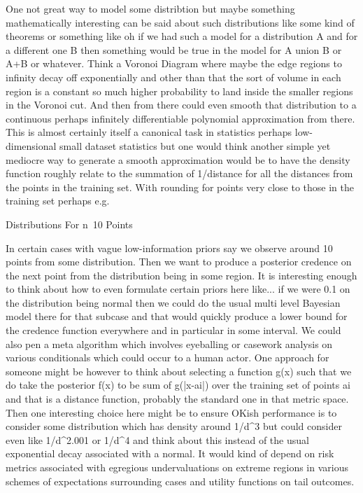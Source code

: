 One not great way to model some distribtion but maybe something mathematically interesting can be said about such distributions like some kind of theorems or something like oh if we had such a model for a distribution A and for a different one B then something would be true in the model for A union B or A+B or whatever. Think a Voronoi Diagram where maybe the edge regions to infinity decay off exponentially and other than that the sort of volume in each region is a constant so much higher probability to land inside the smaller regions in the Voronoi cut. And then from there could even smooth that distribution to a continuous perhaps infinitely differentiable polynomial approximation from there. This is almost certainly itself a canonical task in statistics perhaps low-dimensional small dataset statistics but one would think another simple yet mediocre way to generate a smooth approximation would be to have the density function roughly relate to the summation of 1/distance for all the distances from the points in the training set. With rounding for points very close to those in the training set perhaps e.g.

	Distributions For n~10 Points

In certain cases with vague low-information priors say we observe around 10 points from some distribution. Then we want to produce a posterior credence on the next point from the distribution being in some region. It is interesting enough to think about how to even formulate certain priors here like... if we were 0.1 on the distribution being normal then we could do the usual multi level Bayesian model there for that subcase and that would quickly produce a lower bound for the credence function everywhere and in particular in some interval. We could also pen a meta algorithm which involves eyeballing or casework analysis on various conditionals which could occur to a human actor. One approach for someone might be however to think about selecting a function g(x) such that we do take the posterior f(x) to be sum of g(|x-ai|) over the training set of points ai and that is a distance function, probably the standard one in that metric space. Then one interesting choice here might be to ensure OKish performance is to consider some distribution which has density around 1/d^3 but could consider even like 1/d^2.001 or 1/d^4 and think about this instead of the usual exponential decay associated with a normal. It would kind of depend on risk metrics associated with egregious undervaluations on extreme regions in various schemes of expectations surrounding cases and utility functions on tail outcomes.

